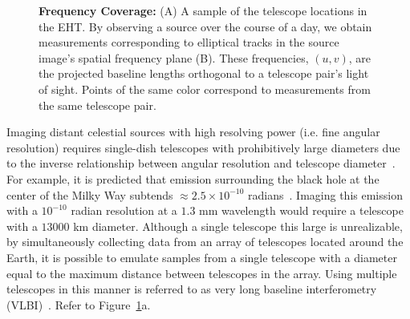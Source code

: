 \begin{figure}[t]
	\centering
	\caption{ \footnotesize{{\bf Frequency Coverage:} (A) A sample of the telescope locations in the EHT. By observing a source over the course of a day, we obtain measurements corresponding to elliptical tracks in the source image's spatial frequency plane (B). These frequencies, $(u,v)$, are the projected baseline lengths orthogonal to a telescope pair's light of sight. Points of the same color correspond to measurements from the same telescope pair.}}
	\label{fig:uvcov}
	\vspace{-0.23in}
\end{figure}


Imaging distant celestial sources with high resolving power (i.e. fine angular resolution) requires single-dish telescopes with prohibitively large diameters due to the inverse relationship between angular resolution and telescope diameter~\cite{thompson2008interferometry}.
For example, it is predicted that emission surrounding the black hole at the center of the Milky Way subtends $\approx 2.5\times 10^{-10}$ radians~\cite{fish2014imaging}. Imaging this emission with a $10^{-10}$ radian resolution at a $1.3$ mm wavelength would require a telescope with a $13000$ km diameter. 
Although a single telescope this large is unrealizable, by simultaneously collecting data from an array of telescopes located around the Earth, it is possible to emulate samples from a single telescope with a diameter equal to the maximum distance between telescopes in the array. Using multiple telescopes in this manner is referred to as very long baseline interferometry (VLBI)~\cite{thompson2008interferometry}.  
Refer to Figure~\ref{fig:uvcov}a.


